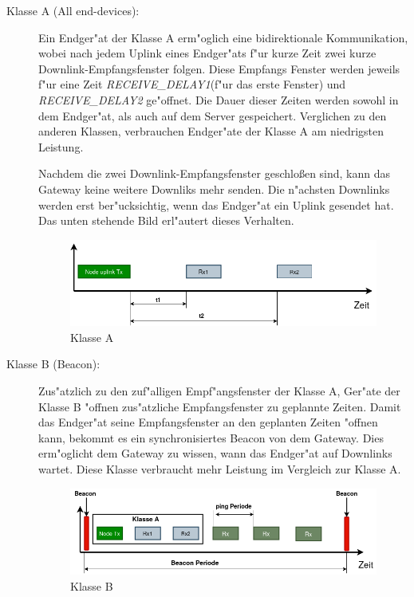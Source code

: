 \begin{description}
	\item [Klasse A (All end-devices): \label{classA}] Ein Endger"at 
	der Klasse A erm"oglich eine bidirektionale Kommunikation, wobei 
	nach jedem Uplink eines Endger"ats f"ur kurze Zeit zwei kurze 
	Downlink-Empfangsfenster folgen. Diese Empfangs Fenster werden 
	jeweils f"ur eine Zeit \textit{RECEIVE\_DELAY1}(f"ur das erste 
	Fenster) und \textit{RECEIVE\_DELAY2} ge"offnet. Die Dauer dieser 
	Zeiten werden sowohl in dem Endger"at, als auch auf dem Server 
	gespeichert. Verglichen zu den anderen Klassen, verbrauchen Endger"ate 
	der Klasse A am niedrigsten Leistung. 
	
	Nachdem die zwei Downlink-Empfangsfenster geschlo\ss{}en sind, kann 
	das Gateway keine weitere Downliks mehr senden. Die n"achsten 
	Downlinks werden erst ber"ucksichtig, wenn das Endger"at ein Uplink 
	gesendet hat.
	Das unten stehende Bild erl"autert dieses Verhalten.
	
	 \begin{figure}[h]
	 	\centering
	 	\includegraphics[width=14cm]{source/images/ClassA}
	 	\caption{Klasse A \label{fig:classA}}
	 \end{figure}
	
	\item [Klasse B (Beacon):] Zus"atzlich zu den zuf"alligen 
	Empf"angsfenster der Klasse A, Ger"ate der Klasse B "offnen 
	zus"atzliche Empfangsfenster zu geplannte Zeiten. Damit das 
	Endger"at seine Empfangsfenster an den geplanten Zeiten "offnen 
	kann, bekommt es  ein synchronisiertes Beacon von dem Gateway. Dies 
	erm"oglicht dem Gateway zu wissen, wann das Endger"at auf Downlinks wartet. Diese Klasse verbraucht mehr Leistung im  Vergleich zur Klasse A. 
	
	 \begin{figure}[h]
		\centering
		\includegraphics[width=12cm]{source/images/ClassB}
		\caption{Klasse B \label{fig:classB}}
	\end{figure}
	

\end{description}
